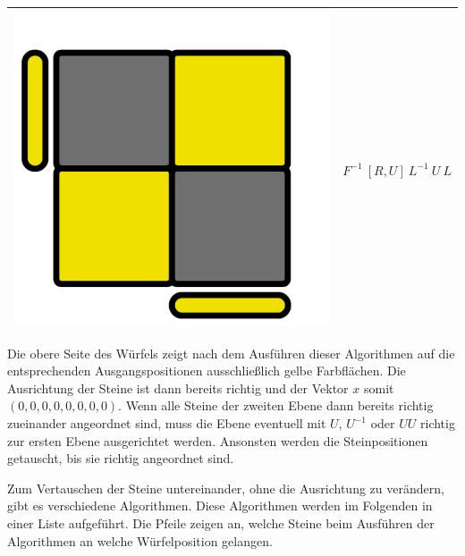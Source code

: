 \documentclass[12pt,a4paper, usenames, dvipsnames]{article}
\theoremstyle{mystyle}
\theoremstyle{definition}
\begin{document}
\begin{center}
\begin{tabular}{m{4cm} m{6cm}}
\includegraphics[scale=0.08]{TOPVIEW6.png} & $F^{-1} \ [ R,U ]\ L^{-1} \ U \ L$ \\
\bottomrule
\end{tabular}
\end{center}


Die obere Seite des Würfels zeigt nach dem Ausführen dieser Algorithmen auf die entsprechenden Ausgangspositionen ausschließlich gelbe Farbflächen. Die Ausrichtung der Steine ist dann bereits richtig und der Vektor $x$ somit $(0,0,0,0,0,0,0,0)$. Wenn alle Steine der zweiten Ebene dann bereits richtig zueinander angeordnet sind, muss die Ebene eventuell mit $U$, $U^{-1}$ oder $UU$ richtig zur ersten Ebene ausgerichtet werden.  Ansonsten werden die Steinpositionen getauscht, bis sie richtig angeordnet sind.

Zum Vertauschen der Steine untereinander, ohne die Ausrichtung zu verändern, gibt es verschiedene Algorithmen. Diese Algorithmen werden im Folgenden in einer Liste aufgeführt. Die Pfeile zeigen an, welche Steine beim Ausführen der Algorithmen an welche Würfelposition gelangen.
\end{document}
